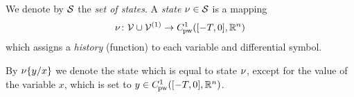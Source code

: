     We denote by $\states$ the \emph{set of states}. A \emph{state} $\asstate\in\states$ is a mapping
    \begin{equation}
        \asstate \from \allvars\cup\diffvars \to \statespace
    \end{equation}
    which assigns a \emph{history} (function) to each variable and differential symbol.

    By $\modif{\asstate}{x}{y}$ we denote the state which is equal to state $\asstate$, except for the value of the variable $x$, which is set to $y\in\statespace$.


    

